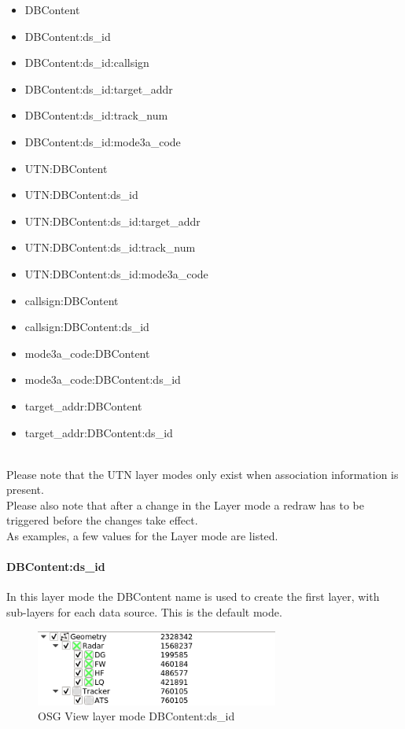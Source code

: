 \begin{itemize}
 \item DBContent
 \item DBContent:ds\_id
 \item DBContent:ds\_id:callsign
 \item DBContent:ds\_id:target\_addr
 \item DBContent:ds\_id:track\_num
 \item DBContent:ds\_id:mode3a\_code
 \item UTN:DBContent
 \item UTN:DBContent:ds\_id
 \item UTN:DBContent:ds\_id:target\_addr
 \item UTN:DBContent:ds\_id:track\_num
 \item UTN:DBContent:ds\_id:mode3a\_code
 \item callsign:DBContent
 \item callsign:DBContent:ds\_id 
 \item mode3a\_code:DBContent
 \item mode3a\_code:DBContent:ds\_id
 \item target\_addr:DBContent
 \item target\_addr:DBContent:ds\_id
\end{itemize}
\  \\

Please note that the UTN layer modes only exist when association information is present. \\

Please also note that after a change in the Layer mode a redraw has to be triggered before the changes take effect. \\

As examples, a few values for the Layer mode are listed. \\

\paragraph{DBContent:ds\_id}

In this layer mode the DBContent name is used to create the first layer, with sub-layers for each data source. This is the default mode.

\begin{figure}[H]
    \center
    \includegraphics[width=8cm,frame]{figures/osgview_group_dbo_ds.png}
  \caption{OSG View layer mode DBContent:ds\_id}
\end{figure}

